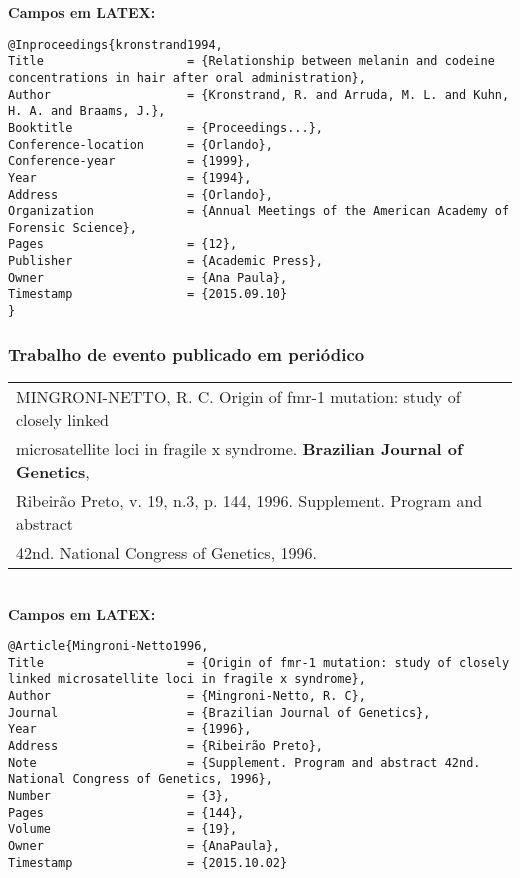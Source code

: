 \textbf{Campos em LATEX:} 

\begin{verbatim}
@Inproceedings{kronstrand1994,
Title                    = {Relationship between melanin and codeine
concentrations in hair after oral administration},
Author                   = {Kronstrand, R. and Arruda, M. L. and Kuhn, 
H. A. and Braams, J.},
Booktitle                = {Proceedings...},
Conference-location      = {Orlando},
Conference-year          = {1999},
Year                     = {1994},
Address                  = {Orlando},
Organization             = {Annual Meetings of the American Academy of 
Forensic Science},
Pages                    = {12},
Publisher                = {Academic Press},
Owner                    = {Ana Paula},
Timestamp                = {2015.09.10}
}
\end{verbatim}
\subsubsection{Trabalho de evento publicado em periódico} 

\begin{tabular}{|l|c|} \hline
	MINGRONI-NETTO, R. C. Origin of fmr-1 mutation: study of closely linked \\microsatellite loci in fragile x syndrome. \textbf{Brazilian Journal of Genetics}, \\Ribeirão Preto, v. 19, n.3, p. 144, 1996. Supplement. Program and abstract \\42nd. National Congress of Genetics, 1996. 
 \\\hline
\end{tabular} \\

\textbf{Campos em LATEX:} 

\begin{verbatim}
@Article{Mingroni-Netto1996,
Title                    = {Origin of fmr-1 mutation: study of closely 
linked microsatellite loci in fragile x syndrome},
Author                   = {Mingroni-Netto, R. C},
Journal                  = {Brazilian Journal of Genetics},
Year                     = {1996},
Address                  = {Ribeirão Preto},
Note                     = {Supplement. Program and abstract 42nd. 
National Congress of Genetics, 1996},
Number                   = {3},
Pages                    = {144},
Volume                   = {19},
Owner                    = {AnaPaula},
Timestamp                = {2015.10.02}
\end{verbatim} \\
